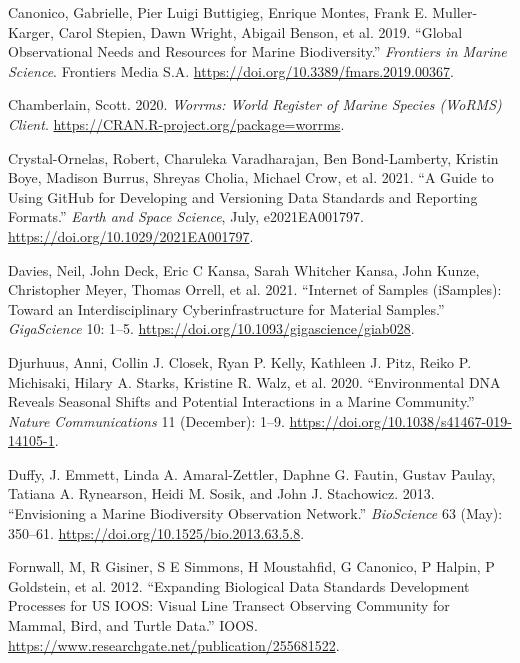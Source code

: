 \documentclass[
]{book}
\newlength{\cslhangindent}
\newlength{\cslentryspacingunit} %
\newenvironment{CSLReferences}[2] %
 {%
  \setlength{\parindent}{0pt}
  \ifodd #1
  \let\oldpar\par
  \def\par{\hangindent=\cslhangindent\oldpar}
  \fi
  \setlength{\parskip}{#2\cslentryspacingunit}
 }%
 {}
\begin{document}
\begin{CSLReferences}{1}{0}
\leavevmode{}%
Canonico, Gabrielle, Pier Luigi Buttigieg, Enrique Montes, Frank E. Muller-Karger, Carol Stepien, Dawn Wright, Abigail Benson, et al. 2019. {``Global Observational Needs and Resources for Marine Biodiversity.''} \emph{Frontiers in Marine Science}. Frontiers Media S.A. \url{https://doi.org/10.3389/fmars.2019.00367}.

\leavevmode{}%
Chamberlain, Scott. 2020. \emph{Worrms: World Register of Marine Species (WoRMS) Client}. \url{https://CRAN.R-project.org/package=worrms}.

\leavevmode{}%
Crystal-Ornelas, Robert, Charuleka Varadharajan, Ben Bond-Lamberty, Kristin Boye, Madison Burrus, Shreyas Cholia, Michael Crow, et al. 2021. {``A Guide to Using GitHub for Developing and Versioning Data Standards and Reporting Formats.''} \emph{Earth and Space Science}, July, e2021EA001797. \url{https://doi.org/10.1029/2021EA001797}.

\leavevmode{}%
Davies, Neil, John Deck, Eric C Kansa, Sarah Whitcher Kansa, John Kunze, Christopher Meyer, Thomas Orrell, et al. 2021. {``Internet of Samples (iSamples): Toward an Interdisciplinary Cyberinfrastructure for Material Samples.''} \emph{GigaScience} 10: 1--5. \url{https://doi.org/10.1093/gigascience/giab028}.

\leavevmode{}%
Djurhuus, Anni, Collin J. Closek, Ryan P. Kelly, Kathleen J. Pitz, Reiko P. Michisaki, Hilary A. Starks, Kristine R. Walz, et al. 2020. {``Environmental DNA Reveals Seasonal Shifts and Potential Interactions in a Marine Community.''} \emph{Nature Communications} 11 (December): 1--9. \url{https://doi.org/10.1038/s41467-019-14105-1}.

\leavevmode{}%
Duffy, J. Emmett, Linda A. Amaral-Zettler, Daphne G. Fautin, Gustav Paulay, Tatiana A. Rynearson, Heidi M. Sosik, and John J. Stachowicz. 2013. {``Envisioning a Marine Biodiversity Observation Network.''} \emph{BioScience} 63 (May): 350--61. \url{https://doi.org/10.1525/bio.2013.63.5.8}.

\leavevmode{}%
Fornwall, M, R Gisiner, S E Simmons, H Moustahfid, G Canonico, P Halpin, P Goldstein, et al. 2012. {``Expanding Biological Data Standards Development Processes for US IOOS: Visual Line Transect Observing Community for Mammal, Bird, and Turtle Data.''} IOOS. \url{https://www.researchgate.net/publication/255681522}.


\end{CSLReferences}
\end{document}
